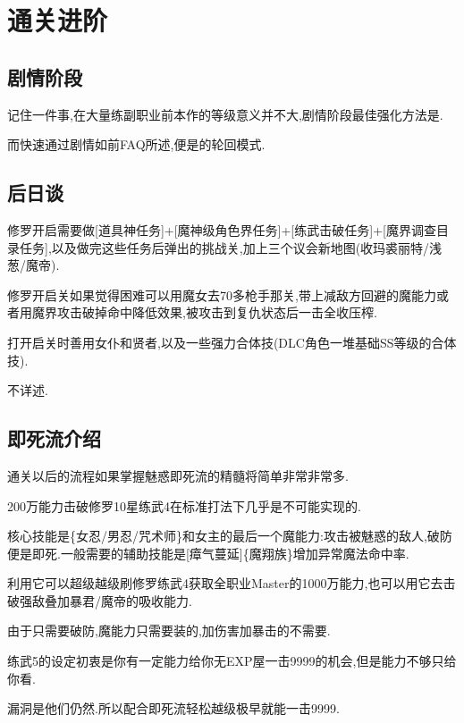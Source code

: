 \newpage

\section{通关进阶}
	
	\subsection{剧情阶段}

	记住一件事,在大量练副职业前本作的等级意义并不大,剧情阶段最佳强化方法是{\color{red}{捕获+榨取+嗑药}}.

	而快速通过剧情如前FAQ所述,便是{\color{red}{魔女+buff+(一触即发)+奥义捕捉+压榨+嗑药}}的轮回模式.

	\subsection{后日谈}

	修罗开启需要做[道具神任务]+[魔神级角色界任务]+[练武击破任务]+[魔界调查目录任务],以及做完这些任务后弹出的挑战关,加上三个议会新地图(收玛裘丽特/浅葱/魔帝).

	修罗开启关如果觉得困难可以用魔女去70多枪手那关,带上减敌方回避的魔能力或者用魔界攻击破掉命中降低效果,被攻击到复仇状态后一击全收压榨.

	打开启关时善用女仆和贤者,以及一些强力合体技(DLC角色一堆基础SS等级的合体技).

	不详述.
	
	\subsection{即死流介绍}

	通关以后的流程如果掌握魅惑即死流的精髓将简单非常非常多.

	200万能力击破修罗10星练武4在标准打法下几乎是不可能实现的.

	核心技能是{\color{red}{魅惑魔法}}\{女忍/男忍/咒术师\}和女主的最后一个魔能力{\color{red}{生杀予夺}}:攻击被魅惑的敌人,破防便是即死.一般需要的辅助技能是[瘴气蔓延]\{魔翔族\}增加异常魔法命中率.

	利用它可以超级越级刷修罗练武4获取全职业Master的1000万能力,也可以用它去击破强敌叠加暴君/魔帝的吸收能力.

	由于只需要破防,魔能力只需要装{\color{red}{加数值加攻击}}的,加伤害加暴击的不需要.

	练武5的设定初衷是你有一定能力给你无EXP屋一击9999的机会,但是能力不够只给你看.

	漏洞是他们仍然{\color{red}{吃即死}}.所以配合即死流轻松越级极早就能一击9999.


